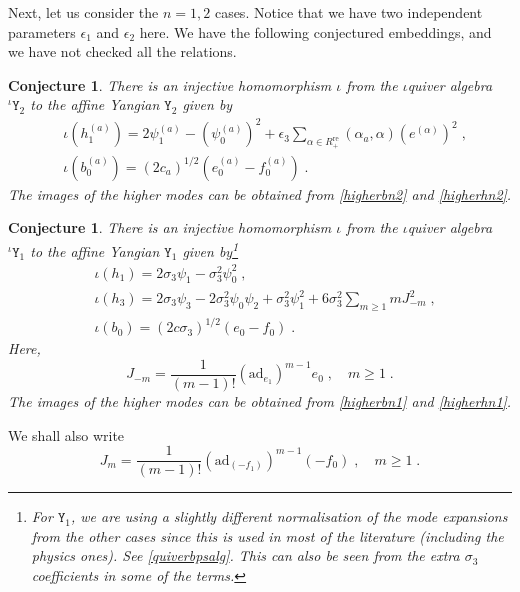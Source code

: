 \documentclass[11pt]{article}
\numberwithin{equation}{section}
\numberwithin{figure}{section}
\numberwithin{table}{section}
\newtheorem{conjecture}[theorem]{Conjecture}
\begin{document}
Next, let us consider the $n=1,2$ cases. Notice that we have two independent parameters $\epsilon_1$ and $\epsilon_2$ here. We have the following conjectured embeddings, and we have not checked all the relations.
\begin{conjecture}\label{embeddingconjY2}
	There is an injective homomorphism $\iota$ from the $\iota$quiver algebra ${}^\iota\mathtt{Y}_2$ to the affine Yangian $\widehat{\mathtt{Y}}_2$ given by
	\begin{subequations}
		\begin{align}
			&\iota\left(h^{(a)}_1\right)=2\psi^{(a)}_1-\left(\psi^{(a)}_0\right)^2+\epsilon_3\sum_{\alpha\in R^\text{re}_+}(\alpha_a,\alpha)\left(e^{(\alpha)}\right)^2\;,\\
			&\iota\left(b^{(a)}_0\right)=(2c_a)^{1/2}\left(e^{(a)}_0-f^{(a)}_0\right)\;.
		\end{align}
	\end{subequations}
	The images of the higher modes can be obtained from \eqref{higherbn2} and \eqref{higherhn2}.
\end{conjecture}
\begin{conjecture}\label{embeddingconjY1}
	There is an injective homomorphism $\iota$ from the $\iota$quiver algebra ${}^\iota\mathtt{Y}_1$ to the affine Yangian $\widehat{\mathtt{Y}}_1$ given by\footnote{For $\mathtt{Y}_1$, we are using a slightly different normalisation of the mode expansions from the other cases since this is used in most of the literature (including the physics ones). See \cref{quiverbpsalg}. This can also be seen from the extra $\sigma_3$ coefficients in some of the terms.}
	\begin{subequations}
		\begin{align}
			&\iota(h_1)=2\sigma_3\psi_1-\sigma_3^2\psi_0^2\;,\\
			&\iota(h_3)=2\sigma_3\psi_3-2\sigma_3^2\psi_0\psi_2+\sigma_3^2\psi_1^2+6\sigma_3^2\sum_{m\geq1}mJ_{-m}^2\;,\\
			&\iota(b_0)=(2c\sigma_3)^{1/2}(e_0-f_0)\;.
		\end{align}
	\end{subequations}
	Here,
	\begin{equation}
		J_{-m}=\frac{1}{(m-1)!}\left(\mathrm{ad}_{e_1}\right)^{m-1}e_0\;,\quad m\geq1\;.
	\end{equation}
	The images of the higher modes can be obtained from \eqref{higherbn1} and \eqref{higherhn1}.
\end{conjecture}
We shall also write
\begin{equation}
	J_m=\frac{1}{(m-1)!}\left(\mathrm{ad}_{(-f_1)}\right)^{m-1}(-f_0)\;,\quad m\geq1\;.
\end{equation}
\end{document}
